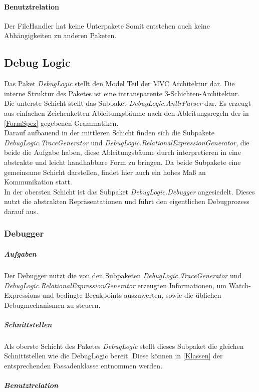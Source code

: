 ﻿\documentclass[parskip=full]{scrartcl}
\begin{document}
\paragraph{Benutztrelation}
Der FileHandler hat keine Unterpakete
Somit entstehen auch keine Abhängigkeiten zu anderen Paketen.

\subsection{Debug Logic}
Das Paket \textit{DebugLogic} stellt den Model Teil der MVC Architektur dar. Die interne Struktur des Paketes ist eine intransparente 3-Schichten-Architektur.\\
Die unterste Schicht stellt das Subpaket \textit{DebugLogic.AntlrParser} dar. Es erzeugt aus einfachen Zeichenketten Ableitungsbäume nach den Ableitungsregeln der in \ref{FormSpez} gegebenen Grammatiken.\\ Darauf aufbauend in der mittleren Schicht finden sich die Subpakete \textit{DebugLogic.TraceGenerator} und \textit{DebugLogic.RelationalExpressionGenerator}, die beide die Aufgabe haben, diese Ableitungsbäume durch interpretieren in eine abstrakte und leicht handhabbare Form zu bringen. Da beide Subpakete eine gemeinsame Schicht darstellen, findet hier auch ein hohes Maß an Kommunikation statt. \\ In der obersten Schicht ist das Subpaket \textit{DebugLogic.Debugger} angesiedelt. Dieses nutzt die abstrakten Repräsentationen und führt den eigentlichen Debugprozess darauf aus.
\subsubsection{Debugger}
\subparagraph{Aufgaben}
Der Debugger nutzt die von den Subpaketen \textit{DebugLogic.TraceGenerator} und \textit{DebugLogic.RelationalExpressionGenerator} erzeugten Informationen, um Watch-Expressions und bedingte Breakpoints auszuwerten, sowie die üblichen Debugmechanismen zu steuern.
\subparagraph{Schnittstellen}
Als oberste Schicht des Paketes \textit{DebugLogic} stellt dieses Subpaket die gleichen Schnittstellen wie die DebugLogic bereit. Diese können in \ref{Klassen} der entsprechenden Fassadenklasse entnommen werden.
\subparagraph{Benutztrelation} 
\end{document}
